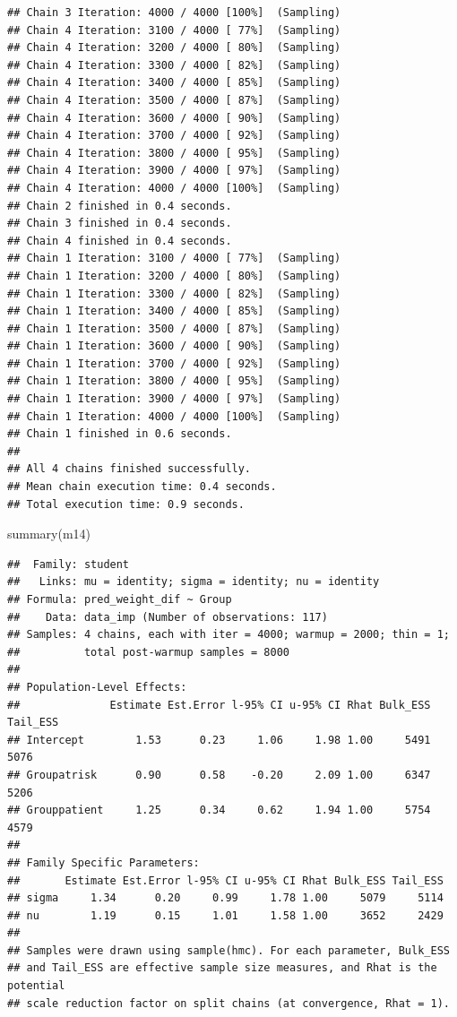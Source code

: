 \documentclass[
]{article}
\newenvironment{Shaded}{\begin{snugshade}}{\end{snugshade}}
\newcommand{\FunctionTok}[1]{\textcolor[rgb]{0.00,0.00,0.00}{#1}}
\newcommand{\NormalTok}[1]{#1}
\begin{document}
\begin{verbatim}
## Chain 3 Iteration: 4000 / 4000 [100%]  (Sampling) 
## Chain 4 Iteration: 3100 / 4000 [ 77%]  (Sampling) 
## Chain 4 Iteration: 3200 / 4000 [ 80%]  (Sampling) 
## Chain 4 Iteration: 3300 / 4000 [ 82%]  (Sampling) 
## Chain 4 Iteration: 3400 / 4000 [ 85%]  (Sampling) 
## Chain 4 Iteration: 3500 / 4000 [ 87%]  (Sampling) 
## Chain 4 Iteration: 3600 / 4000 [ 90%]  (Sampling) 
## Chain 4 Iteration: 3700 / 4000 [ 92%]  (Sampling) 
## Chain 4 Iteration: 3800 / 4000 [ 95%]  (Sampling) 
## Chain 4 Iteration: 3900 / 4000 [ 97%]  (Sampling) 
## Chain 4 Iteration: 4000 / 4000 [100%]  (Sampling) 
## Chain 2 finished in 0.4 seconds.
## Chain 3 finished in 0.4 seconds.
## Chain 4 finished in 0.4 seconds.
## Chain 1 Iteration: 3100 / 4000 [ 77%]  (Sampling) 
## Chain 1 Iteration: 3200 / 4000 [ 80%]  (Sampling) 
## Chain 1 Iteration: 3300 / 4000 [ 82%]  (Sampling) 
## Chain 1 Iteration: 3400 / 4000 [ 85%]  (Sampling) 
## Chain 1 Iteration: 3500 / 4000 [ 87%]  (Sampling) 
## Chain 1 Iteration: 3600 / 4000 [ 90%]  (Sampling) 
## Chain 1 Iteration: 3700 / 4000 [ 92%]  (Sampling) 
## Chain 1 Iteration: 3800 / 4000 [ 95%]  (Sampling) 
## Chain 1 Iteration: 3900 / 4000 [ 97%]  (Sampling) 
## Chain 1 Iteration: 4000 / 4000 [100%]  (Sampling) 
## Chain 1 finished in 0.6 seconds.
## 
## All 4 chains finished successfully.
## Mean chain execution time: 0.4 seconds.
## Total execution time: 0.9 seconds.
\end{verbatim}

\begin{Shaded}
\begin{Highlighting}[]
\FunctionTok{summary}\NormalTok{(m14)}
\end{Highlighting}
\end{Shaded}

\begin{verbatim}
##  Family: student 
##   Links: mu = identity; sigma = identity; nu = identity 
## Formula: pred_weight_dif ~ Group 
##    Data: data_imp (Number of observations: 117) 
## Samples: 4 chains, each with iter = 4000; warmup = 2000; thin = 1;
##          total post-warmup samples = 8000
## 
## Population-Level Effects: 
##              Estimate Est.Error l-95% CI u-95% CI Rhat Bulk_ESS Tail_ESS
## Intercept        1.53      0.23     1.06     1.98 1.00     5491     5076
## Groupatrisk      0.90      0.58    -0.20     2.09 1.00     6347     5206
## Grouppatient     1.25      0.34     0.62     1.94 1.00     5754     4579
## 
## Family Specific Parameters: 
##       Estimate Est.Error l-95% CI u-95% CI Rhat Bulk_ESS Tail_ESS
## sigma     1.34      0.20     0.99     1.78 1.00     5079     5114
## nu        1.19      0.15     1.01     1.58 1.00     3652     2429
## 
## Samples were drawn using sample(hmc). For each parameter, Bulk_ESS
## and Tail_ESS are effective sample size measures, and Rhat is the potential
## scale reduction factor on split chains (at convergence, Rhat = 1).
\end{verbatim}
\end{document}
